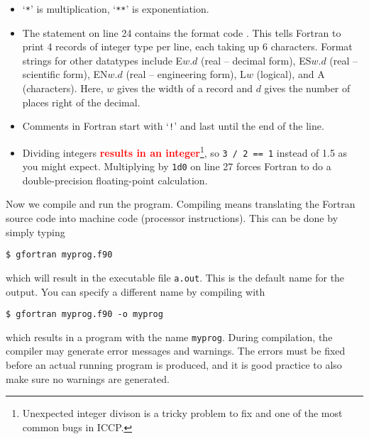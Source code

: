 \begin{itemize}
  \item `\texttt{*}' is multiplication, `\texttt{**}' is exponentiation.
  \item The  statement on line 24 contains the format code .
    This tells Fortran to print 4 records of integer type per line, each taking up 6 characters.
    Format strings for other datatypes include E$w.d$ (real -- decimal form), ES$w.d$ (real -- scientific form), EN$w.d$ (real -- engineering form), L$w$ (logical), and A (characters). Here, $w$ gives the width of a record and $d$ gives the number of places right of the decimal.
  \item Comments in Fortran start with `\texttt{!}' and last until the end of the line.
  \item Dividing integers \textcolor{red}{\textbf{results in an integer}}\footnote{Unexpected integer divison is a tricky problem to fix and one of the most common bugs in ICCP.}, so \texttt{3 / 2 == 1} instead of 1.5 as you might expect.
    Multiplying by \texttt{1d0} on line 27 forces Fortran to do a double-precision floating-point calculation.
\end{itemize}
Now we compile and run the program.
Compiling means translating the Fortran source code into machine code (processor instructions).
This can be done by simply typing
\begin{verbatim}
$ gfortran myprog.f90
\end{verbatim}
which will result in the executable file \texttt{a.out}.
This is the default name for the output.
You can specify a different name by compiling with
\begin{verbatim}
$ gfortran myprog.f90 -o myprog
\end{verbatim}
which results in a program with the name \texttt{myprog}.
During compilation, the compiler may generate error messages and warnings.
The errors must be fixed before an actual running program is produced, and it is good practice to also make sure no warnings are generated.

